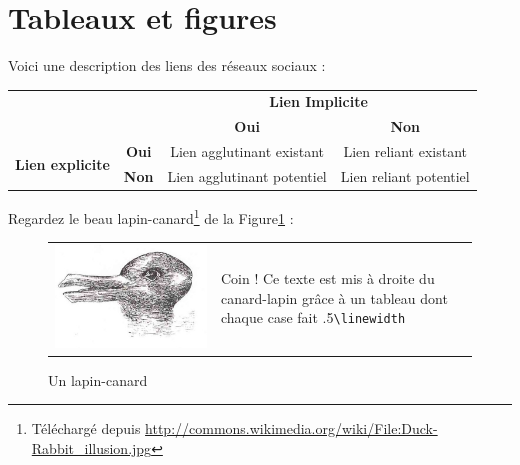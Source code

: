 \documentclass{scrartcl}
\begin{document}
\section{Tableaux et figures}
    Voici une description des liens des réseaux sociaux :
    \begin{center}
        \begin{tabular}{cccc}
            \toprule
            {}&{}&\multicolumn{2}{c}{\textbf{Lien Implicite}}\\
            \cmidrule{3-4}
            {}&{}& \textbf{Oui}&\textbf{Non}\\
            \cmidrule{3-4}
            \multirow{2}{*}{\textbf{Lien explicite}} & \textbf{Oui} & Lien agglutinant existant & Lien reliant existant\\
            & \textbf{Non} & Lien agglutinant potentiel & Lien reliant potentiel\\
            \bottomrule
        \end{tabular}        
    \end{center}
    Regardez le beau lapin-canard\footnote{Téléchargé depuis \url{http://commons.wikimedia.org/wiki/File:Duck-Rabbit_illusion.jpg}} de la Figure\ref{fig : lapin-canard} : 
    \begin{figure}
        \centering
        \begin{tabular}{m{.5\linewidth}m{.5\linewidth}}
            \includegraphics{Duck-Rabbit_illusion.jpg} & Coin ! Ce texte est mis à droite du canard-lapin grâce à un tableau dont chaque case fait .5\texttt{\textbackslash linewidth}
        \end{tabular}
        \caption{Un lapin-canard}        
        \label{fig : lapin-canard}
    \end{figure}
\end{document}
